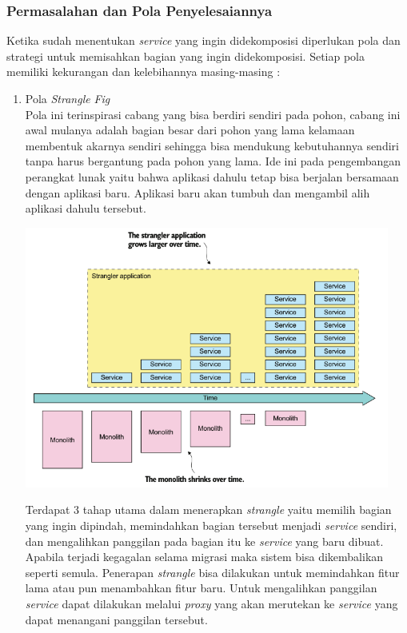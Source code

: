 \subsubsection{Permasalahan dan Pola Penyelesaiannya}
Ketika sudah menentukan \textit{service} yang ingin didekomposisi diperlukan pola dan strategi untuk memisahkan bagian yang ingin didekomposisi. Setiap pola memiliki kekurangan dan kelebihannya masing-masing \cite{74C}:
\begin{enumerate}[leftmargin=1.3cm]
	\item Pola \textit{Strangle} \textit{Fig} \\
		  Pola ini terinspirasi cabang yang bisa berdiri sendiri pada pohon, cabang ini awal mulanya adalah bagian besar dari pohon yang lama kelamaan membentuk akarnya sendiri sehingga bisa mendukung kebutuhannya sendiri tanpa harus bergantung pada pohon yang lama.  Ide ini pada pengembangan perangkat lunak yaitu bahwa aplikasi dahulu tetap bisa berjalan bersamaan dengan aplikasi baru. Aplikasi baru akan tumbuh dan mengambil alih aplikasi dahulu tersebut.

		  \begin{center}
			\includegraphics[width=12cm]{img/bab_2/strangle_timeline.png}
			\label{fig:asd}
		  \end{center}

		  Terdapat 3 tahap utama dalam menerapkan \textit{strangle} yaitu memilih bagian yang ingin dipindah, memindahkan bagian tersebut menjadi \textit{service} sendiri, dan mengalihkan panggilan pada bagian itu ke \textit{service} yang baru dibuat. Apabila terjadi kegagalan selama migrasi maka sistem bisa dikembalikan seperti semula. Penerapan \textit{strangle} bisa dilakukan untuk memindahkan fitur lama atau pun menambahkan fitur baru.	Untuk mengalihkan panggilan \textit{service} dapat dilakukan melalui \textit{proxy} yang akan merutekan ke \textit{service} yang dapat menangani panggilan tersebut.


\end{enumerate}
